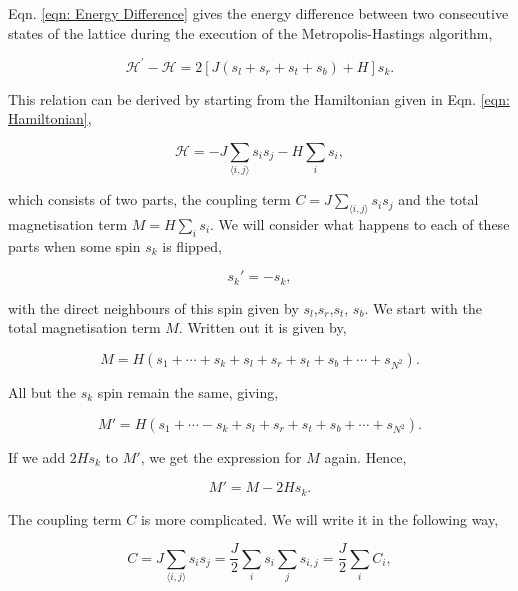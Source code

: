 \documentclass{IAYCPro}
\begin{document}
Eqn. \ref{eqn: Energy Difference} gives the energy difference between two consecutive states of the lattice during the execution of the Metropolis-Hastings algorithm,

\begin{equation}
    \mathcal{H}^{\prime}-\mathcal{H}=2\left[ J \left(s_l+s_r+s_t+s_b\right)+ H\right]s_k.
\end{equation}

This relation can be derived by starting from the Hamiltonian given in Eqn. \ref{eqn: Hamiltonian},

\begin{equation}
    \mathcal{H} = -J\sum_{\langle i,j\rangle} s_is_j - H \sum_i s_i,
\end{equation}

which consists of two parts, the coupling term $C=J\sum_{\langle i,j\rangle} s_is_j$ and the total magnetisation term $M=H \sum_i s_i$. We will consider what happens to each of these parts when some spin $s_k$ is flipped,

\begin{equation}
    s_k' = -s_k,
\end{equation}

with the direct neighbours of this spin given by $s_l$,\;$s_r$,\;$s_t$,\; $s_b$. We start with the total magnetisation term $M$. Written out it is given by,

\begin{equation}
    M = H\left(s_1 + \cdots + s_k + s_l + s_r + s_t + s_b + \cdots + s_{N^2} \right).
\end{equation}

All but the $s_k$ spin remain the same, giving, 

\begin{equation}
    M' = H\left(s_1 + \cdots - s_k + s_l + s_r + s_t + s_b + \cdots + s_{N^2} \right).
\end{equation}

If we add $2Hs_k$ to $M'$, we get the expression for $M$ again. Hence,

\begin{equation}
    M' = M - 2Hs_k.
\end{equation}

The coupling term $C$ is more complicated. We will write it in the following way,

\begin{equation}
    C = J\sum_{\langle i,j\rangle} s_i s_j = \frac{J}{2}\sum_i s_i \sum_{j} s_{i,j} = \frac{J}{2}\sum_i C_i,
\end{equation}
\end{document}
